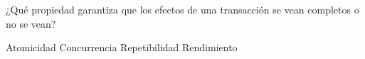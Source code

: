 \question[1] ¿Qué propiedad garantiza que los efectos de una transacción se vean completos o no se vean?
\begin{choices}
\CorrectChoice Atomicidad
\choice Concurrencia
\choice Repetibilidad
\choice Rendimiento
\end{choices}